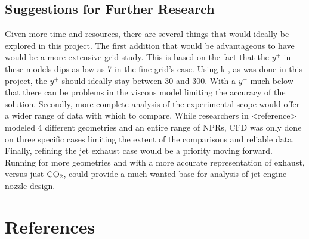 \documentclass[12pt]{article} %
\begin{document}
\subsection{Suggestions for Further Research}
Given more time and resources, there are several things that would ideally be explored in this project. The first addition that would be advantageous to have would be a more extensive grid study. This is based on the fact that the $y^+$ in these models dips as low as 7 in the fine grid’s case. Using k-\textepsilon, as was done in this project, the $y^+$ should ideally stay between 30 and 300. With a $y^+$ much below that there can be problems in the viscous model limiting the accuracy of the solution. Secondly, more complete analysis of the experimental scope would offer a wider range of data with which to compare. While researchers in <reference> modeled 4 different geometries and an entire range of NPRs, CFD was only done on three specific cases limiting the extent of the comparisons and reliable data. Finally, refining the jet exhaust case would be a priority moving forward. Running for more geometries and with a more accurate representation of exhaust, versus just $\textnormal{CO}_2$, could provide a much-wanted base for analysis of jet engine nozzle design.


\section{References}
\nocite{*}
\begingroup
\renewcommand{\section}[2]{}%


\endgroup
\end{document}
